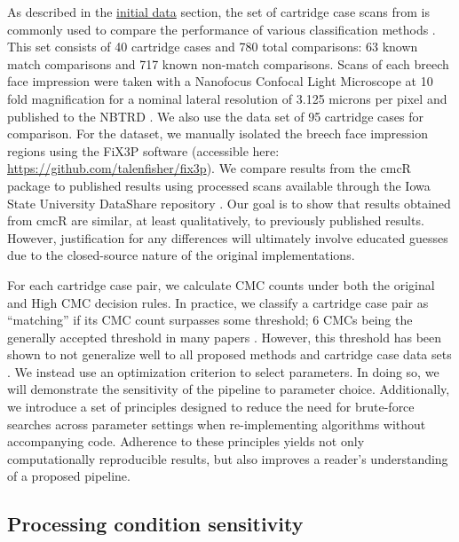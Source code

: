 \documentclass[11pt,]{isuthesis}
\begin{document}
As described in the \protect\hyperlink{initialData}{initial data} section, the set of cartridge case scans from \citet{fadul_empirical_2011} is commonly used to compare the performance of various classification methods \citep{song_3d_2014, tong_improved_2015, chen_convergence_2017}.
This set consists of 40 cartridge cases and 780 total comparisons: 63 known match comparisons and 717 known non-match comparisons.
Scans of each breech face impression were taken with a Nanofocus Confocal Light Microscope at 10 fold magnification for a nominal lateral resolution of 3.125 microns per pixel and published to the NBTRD \citep{nbtrd}.
We also use the \citet{weller_2012} data set of 95 cartridge cases for comparison.
For the \citet{weller_2012} dataset, we manually isolated the breech face impression regions using the FiX3P software (accessible here: \url{https://github.com/talenfisher/fix3p}).
We compare results from the cmcR package to published results using processed scans available through the Iowa State University DataShare repository \citep{cartridgeCaseDataSet}.
Our goal is to show that results obtained from cmcR are similar, at least qualitatively, to previously published results.
However, justification for any differences will ultimately involve educated guesses due to the closed-source nature of the original implementations.

For each cartridge case pair, we calculate CMC counts under both the original and High CMC decision rules.
In practice, we classify a cartridge case pair as ``matching'' if its CMC count surpasses some threshold; 6 CMCs being the generally accepted threshold in many papers \citep{tong_improved_2015, song_estimating_2018, song_proposed_2013}.
However, this threshold has been shown to not generalize well to all proposed methods and cartridge case data sets \citep{chen_convergence_2017}.
We instead use an optimization criterion to select parameters.
In doing so, we will demonstrate the sensitivity of the pipeline to parameter choice.
Additionally, we introduce a set of principles designed to reduce the need for brute-force searches across parameter settings when re-implementing algorithms without accompanying code.
Adherence to these principles yields not only computationally reproducible results, but also improves a reader's understanding of a proposed pipeline.

\hypertarget{processing-condition-sensitivity}{%
\subsection{Processing condition sensitivity}\label{processing-condition-sensitivity}}
\end{document}
